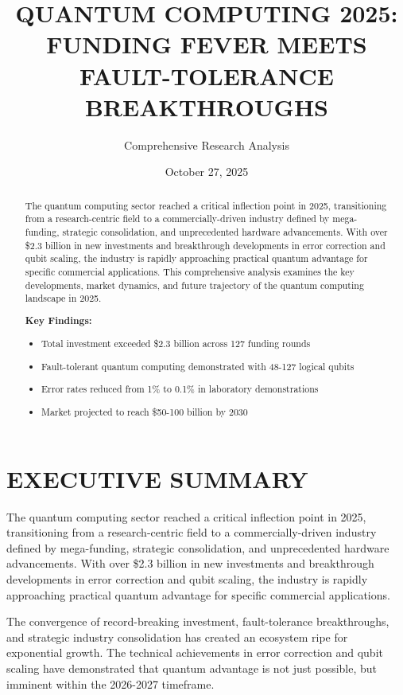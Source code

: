 \documentclass[12pt,a4paper]{article}
\title{\huge\bfseries\sffamily
QUANTUM COMPUTING 2025: FUNDING FEVER MEETS FAULT-TOLERANCE BREAKTHROUGHS}
\author{Comprehensive Research Analysis}
\date{October 27, 2025}
\begin{document}
\maketitle

\tableofcontents
\newpage

\begin{abstract}
\noindent
The quantum computing sector reached a critical inflection point in 2025, transitioning from a research-centric field to a commercially-driven industry defined by mega-funding, strategic consolidation, and unprecedented hardware advancements. With over \$2.3 billion in new investments and breakthrough developments in error correction and qubit scaling, the industry is rapidly approaching practical quantum advantage for specific commercial applications. This comprehensive analysis examines the key developments, market dynamics, and future trajectory of the quantum computing landscape in 2025.

\textbf{Key Findings:}
\begin{itemize}
    \item Total investment exceeded \$2.3 billion across 127 funding rounds
    \item Fault-tolerant quantum computing demonstrated with 48-127 logical qubits
    \item Error rates reduced from 1\% to 0.1\% in laboratory demonstrations
    \item Market projected to reach \$50-100 billion by 2030
\end{itemize}
\end{abstract}

\section{EXECUTIVE SUMMARY}

The quantum computing sector reached a critical inflection point in 2025, transitioning from a research-centric field to a commercially-driven industry defined by mega-funding, strategic consolidation, and unprecedented hardware advancements. With over \$2.3 billion in new investments and breakthrough developments in error correction and qubit scaling, the industry is rapidly approaching practical quantum advantage for specific commercial applications.

The convergence of record-breaking investment, fault-tolerance breakthroughs, and strategic industry consolidation has created an ecosystem ripe for exponential growth. The technical achievements in error correction and qubit scaling have demonstrated that quantum advantage is not just possible, but imminent within the 2026-2027 timeframe.
\end{document}
